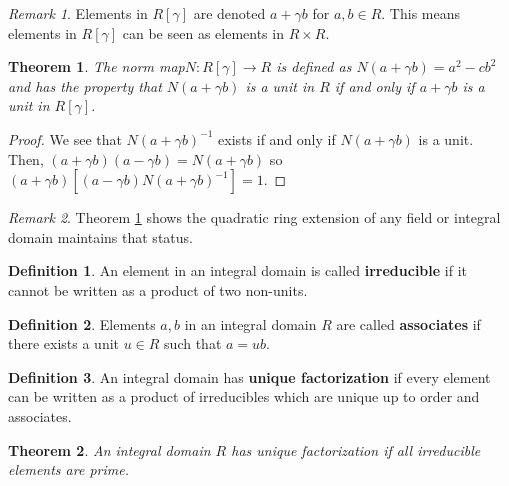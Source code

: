 \documentclass[
    parskip=half,
    toc=flat,
    toc=sectionentrydotfill,
]{scrartcl}  %
\theoremstyle{definition}
\newtheorem{definition}{Definition}[section]
\theoremstyle{plain}
\newtheorem{theorem}{Theorem}[definition]
\theoremstyle{remark}
\newtheorem{remark}{Remark}[definition]
\begin{document}
\begin{remark}
    Elements in $R[\gamma]$ are denoted $a+\gamma b$ for $a,b\in R$.
    This means elements in $R[\gamma]$ can be seen as elements in $R\times R$.
\end{remark}

\begin{theorem}
    \label{thm:norm map}
    The norm map\footnotemark $N:R[\gamma]\to R$ is defined as
    $N(a+\gamma b)=a^2-cb^2$ and has the property that $N(a+\gamma b)$ is a
    unit in $R$ if and only if $a+\gamma b$ is a unit in $R[\gamma]$.
\end{theorem}

\begin{proof}
    We see that $N(a+\gamma b)^{-1}$ exists if and only if $N(a+\gamma b)$ is a unit.
    Then, $(a+\gamma b)(a-\gamma b)=N(a+\gamma b)$ so
    $(a+\gamma b)\left[(a-\gamma b)N(a+\gamma b)^{-1}\right]=1$.
\end{proof}

\begin{remark}
    Theorem \ref{thm:norm map} shows the quadratic ring extension of any field
    or integral domain maintains that status.
\end{remark}

\begin{definition}
    An element in an integral domain is called \textbf{irreducible} if it
    cannot be written as a product of two non-units.
\end{definition}

\begin{definition}
    Elements $a,b$ in an integral domain $R$ are called \textbf{associates} if
    there exists a unit $u\in R$ such that $a=ub$.
\end{definition}

\begin{definition}
    \label{def:unique factorization}
    An integral domain has \textbf{unique factorization} if every element can
    be written as a product of irreducibles which are unique up to order and
    associates.
\end{definition}

\begin{theorem}
    \label{thm:unique factorization}
    An integral domain $R$ has unique factorization if all irreducible elements
    are prime.
\end{theorem}
\end{document}
